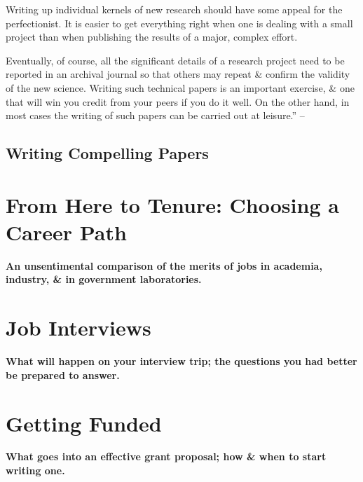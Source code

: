 \documentclass{article}
\numberwithin{equation}{section}
\begin{document}
Writing up individual kernels of new research should have some appeal for the perfectionist. It is easier to get everything right when one is dealing with a small project than when publishing the results of a major, complex effort.

Eventually, of course, all the significant details of a research project need to be reported in an archival journal so that others may repeat \& confirm the validity of the new science. Writing such technical papers is an important exercise, \& one that will win you credit from your peers if you do it well. On the other hand, in most cases the writing of such papers can be carried out at leisure.'' -- \cite[pp. 54--58]{Feibelman2011}

\subsection{Writing Compelling Papers}


\section{From Here to Tenure: Choosing a Career Path}

\begin{center}
	\textsf{\textbf{An unsentimental comparison of the merits of jobs in academia, industry, \& in government laboratories.}}
\end{center}


\section{Job Interviews}

\begin{center}
	\textsf{\textbf{What will happen on your interview trip; the questions you had better be prepared to answer.}}
\end{center}


\section{Getting Funded}

\begin{center}
	\textsf{\textbf{What goes into an effective grant proposal; how \& when to start writing one.}}
\end{center}
\end{document}

